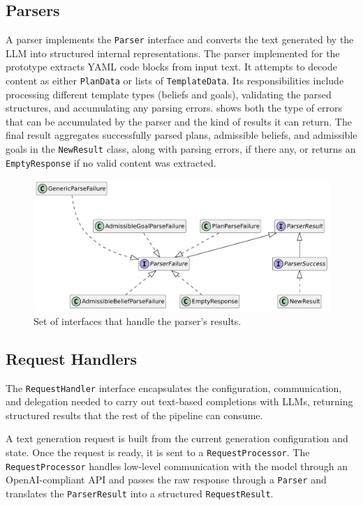 \documentclass[12pt,a4paper,openright,twoside]{book}
\begin{document}
\subsection{Parsers}\label{sec:parsers}

A parser implements the \texttt{Parser} interface and converts the text generated by the \ac{LLM} into structured internal representations. 
%
The parser implemented for the prototype extracts YAML code blocks from input text.
%
It attempts to decode content as either \texttt{PlanData} or lists of \texttt{TemplateData}. 
%
Its responsibilities include processing different template types (beliefs and goals), validating the parsed structures, and accumulating any parsing errors.
%
 shows both the type of errors that can be accumulated by the parser and the kind of results it can return.
%
The final result aggregates successfully parsed plans, admissible beliefs, and admissible goals in the \texttt{NewResult} class, along with parsing errors, if there any, or returns an \texttt{EmptyResponse} if no valid content was extracted.

\begin{figure}
    \centering
    \includegraphics[width=\textwidth]{figures/parser-result.pdf}
    \caption{Set of interfaces that handle the parser's results.}
    \label{fig:parser-result}
\end{figure}

\subsection{Request Handlers}\label{sec:request-handlers}

The \texttt{RequestHandler} interface encapsulates the configuration, communication, and delegation needed to carry out text-based completions with \acp{LLM}, returning structured results that the rest of the pipeline can consume.

A text generation request is built from the current generation configuration and state.
%
Once the request is ready, it is sent to a \texttt{RequestProcessor}.
%
The \texttt{RequestProcessor} handles low-level communication with the model through an OpenAI-compliant API and passes the raw response through a \texttt{Parser} and translates the \texttt{ParserResult} into a structured \texttt{RequestResult}.
\end{document}
